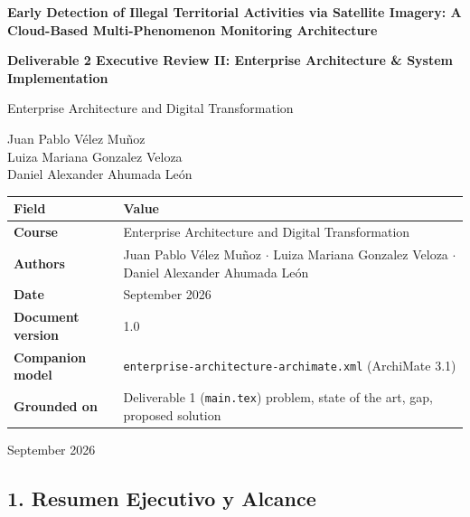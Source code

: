 \documentclass{article}
\begin{document}

\begin{titlepage}
  \centering
  \vspace*{1.2cm}
  {\Large \textbf{Early Detection of Illegal Territorial Activities via Satellite Imagery: A Cloud-Based Multi-Phenomenon Monitoring Architecture}\par}
  \vspace{0.9cm}
  {\large \textbf{Deliverable 2 \textemdash{} Executive Review II: Enterprise Architecture \& System Implementation}\par}
  \vspace{1.0cm}
  {\large Enterprise Architecture and Digital Transformation\par}
  \vspace{1.4cm}
  {\large
  Juan Pablo Vélez Muñoz \\
  Luiza Mariana Gonzalez Veloza \\
  Daniel Alexander Ahumada León \\
  \par}
  \vspace{1.0cm}

{\small
\begin{tabular}{@{}L{1.20in}L{3.55in}@{}}
\toprule
Field & Value \\
\midrule
\textbf{Course} & Enterprise Architecture and Digital Transformation \\
\textbf{Authors} & Juan Pablo Vélez Muñoz \ensuremath{\cdot} Luiza Mariana Gonzalez Veloza \ensuremath{\cdot} Daniel Alexander Ahumada León \\
\textbf{Date} & September 2026 \\
\textbf{Document version} & 1.0 \\
\textbf{Companion model} & \texttt{enterprise-\allowbreak{}architecture-\allowbreak{}archimate.\allowbreak{}xml} (ArchiMate 3.1) \\
\textbf{Grounded on} & Deliverable 1 (\texttt{main.\allowbreak{}tex}) \textemdash{} problem, state of the art, gap, proposed solution \\
\bottomrule
\end{tabular}\par}

  \vfill
  {\large September 2026\par}
\end{titlepage}

\tableofcontents
\newpage

\subsection{1. Resumen Ejecutivo y Alcance}
\end{document}

